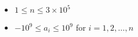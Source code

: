 \begin{itemize}
\tightlist
\item $1 \leq n \leq 3 \times 10^5$
\item $-10^9 \leq a_i \leq 10^9$ for $i = 1, 2, \ldots, n$
\end{itemize}
